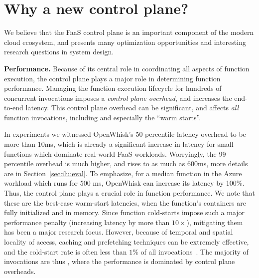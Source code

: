 \section{Why a new control plane?}
\label{sec:ilu-motivation}

We believe that the FaaS control plane is an important component of the modern cloud ecosystem, and presents many optimization opportunities and interesting research questions in system design. 

\textbf{Performance.}
%
Because of its central role in coordinating all aspects of function execution, the control plane plays a major role in determining function performance. 
Managing the function execution lifecycle for hundreds of concurrent invocations imposes a \emph{control plane overhead}, and increases the end-to-end latency.
This control plane overhead can be significant, and affects \emph{all} function invocations, including and especially the ``warm starts''. 


In experiments we witnessed OpenWhisk's 50 percentile latency overhead to be more than 10ms,  which is already a significant increase in latency for small functions which dominate real-world FaaS workloads.
Worryingly, the 99 percentile overhead is much higher, and rises to as much as 600ms, more details are in Section~\ref{sec:ilu:eval}.
To emphasize, for a median function in the Azure workload which runs for 500 ms, OpenWhisk can increase its latency by 100\%.  
Thus, the control plane plays a crucial role in function performance.
We note that these are the best-case warm-start latencies, when the function's containers are fully initialized and in memory. 
Since function cold-starts impose such a major performance penalty (increasing latency by more than $10\times$), mitigating them has been a major research focus. 
However, because of temporal and spatial locality of access, caching and prefetching techniques can be extremely effective, and the cold-start rate is often less than $1\% $ of all invocations~\cite{faascache-asplos21}. 
The majority of invocations are thus , where the performance is dominated by control plane overheads.

